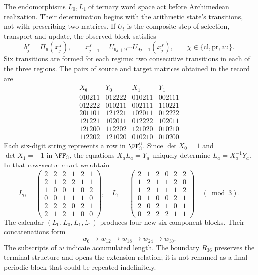 The endomorphisms \(L_0,L_1\) of ternary word space act before Archimedean realization. Their determination begins with the arithmetic state's transitions, not with prescribing two matrices. If \(U_t\) is the composite step of selection, transport and update, the observed block satisfies
\[
 b_j^\chi=\Pi_6(x_j^\chi),\qquad
 x_{j+1}^\chi=U_{9j+9}\cdots U_{9j+1}(x_j^\chi),
 \qquad \chi\in\{\mathrm{cl},\mathrm{pr},\mathrm{au}\}.
\]
Six transitions are formed for each regime: two consecutive transitions in each of the three regions. The pairs of source and target matrices obtained in the record are
\[
\begin{array}{c|c|c|c}
X_0&Y_0&X_1&Y_1\\\hline
010211&012222&010211&002111\\
012222&010211&002111&110221\\
201101&121221&102011&012222\\
121221&102011&012222&102011\\
121200&112202&121020&010210\\
112202&121020&010210&010200
\end{array}
\]
Each six-digit string represents a row in \(\FF_3^6\). Since \(\det X_0=1\) and \(\det X_1=-1\) in \(\FF_3\), the equations \(X_aL_a=Y_a\) uniquely determine \(L_a=X_a^{-1}Y_a\). In that row-vector chart we obtain
\[
 L_0=\begin{pmatrix}
 2&2&2&1&2&1\\2&1&2&2&1&1\\1&0&0&1&0&2\\
 0&0&1&1&1&0\\2&2&2&0&2&1\\2&1&2&1&0&0
 \end{pmatrix},\quad
 L_1=\begin{pmatrix}
 2&1&2&0&2&2\\1&2&1&1&2&0\\1&2&1&1&1&2\\
 0&1&0&0&2&1\\2&0&2&1&0&1\\0&2&2&2&1&1
 \end{pmatrix}\quad(\bmod3).
\]
The calendar \((L_0,L_0,L_1,L_1)\) produces four new six-component blocks. Their concatenations form
\[
 w_6\longrightarrow w_{12}\longrightarrow w_{18}
 \longrightarrow w_{24}\longrightarrow w_{30}.
\]
The subscripts of \(w\) indicate accumulated length. The boundary \(R_{36}\) preserves the terminal structure and opens the extension relation; it is not renamed as a final periodic block that could be repeated indefinitely.

